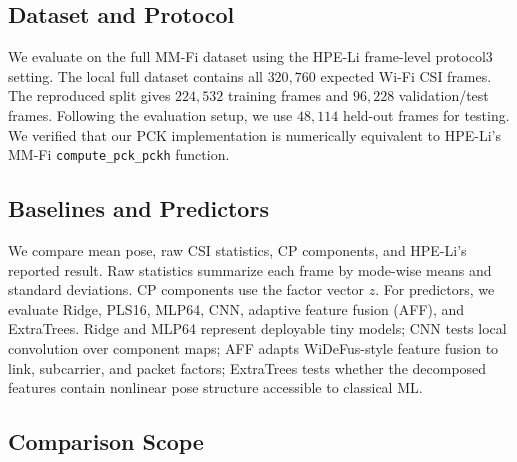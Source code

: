 \documentclass[letterpaper]{article}
\begin{document}
\subsection{Dataset and Protocol}

We evaluate on the full MM-Fi dataset using the HPE-Li frame-level protocol3 setting. The local full dataset contains all $320{,}760$ expected Wi-Fi CSI frames. The reproduced split gives $224{,}532$ training frames and $96{,}228$ validation/test frames. Following the evaluation setup, we use $48{,}114$ held-out frames for testing. We verified that our PCK implementation is numerically equivalent to HPE-Li's MM-Fi \texttt{compute\_pck\_pckh} function.

\subsection{Baselines and Predictors}

We compare mean pose, raw CSI statistics, CP components, and HPE-Li's reported result. Raw statistics summarize each frame by mode-wise means and standard deviations. CP components use the factor vector $z$. For predictors, we evaluate Ridge, PLS16, MLP64, CNN, adaptive feature fusion (AFF), and ExtraTrees. Ridge and MLP64 represent deployable tiny models; CNN tests local convolution over component maps; AFF adapts WiDeFus-style feature fusion to link, subcarrier, and packet factors; ExtraTrees tests whether the decomposed features contain nonlinear pose structure accessible to classical ML.

\subsection{Comparison Scope}
\end{document}
